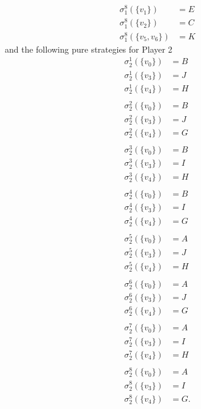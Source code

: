 \documentclass[a4paper]{article}
\begin{document}
\begin{exercise}{3}
\begin{enumerate}[label=(\alph*)]
\begin{enumerate}[label=(\roman*)]
\begin{align*}
            \sigma_1^{8}(\{v_1\}) &= E \\
            \sigma_1^{8}(\{v_2\}) &= C \\
            \sigma_1^{8}(\{v_5, v_6\}) &= K
          \end{align*}
          and the following pure strategies for Player 2
          \begin{align*}
            \sigma_2^{1}(\{v_0\}) &= B \\
            \sigma_2^{1}(\{v_3\}) &= J \\
            \sigma_2^{1}(\{v_4\}) &= H \\
            \\
            \sigma_2^{2}(\{v_0\}) &= B \\
            \sigma_2^{2}(\{v_3\}) &= J \\
            \sigma_2^{2}(\{v_4\}) &= G \\
            \\
            \sigma_2^{3}(\{v_0\}) &= B \\
            \sigma_2^{3}(\{v_3\}) &= I \\
            \sigma_2^{3}(\{v_4\}) &= H \\
            \\
            \sigma_2^{4}(\{v_0\}) &= B \\
            \sigma_2^{4}(\{v_3\}) &= I \\
            \sigma_2^{4}(\{v_4\}) &= G \\
            \\
            \sigma_2^{5}(\{v_0\}) &= A \\
            \sigma_2^{5}(\{v_3\}) &= J \\
            \sigma_2^{5}(\{v_4\}) &= H \\
            \\
            \sigma_2^{6}(\{v_0\}) &= A \\
            \sigma_2^{6}(\{v_3\}) &= J \\
            \sigma_2^{6}(\{v_4\}) &= G \\
            \\
            \sigma_2^{7}(\{v_0\}) &= A \\
            \sigma_2^{7}(\{v_3\}) &= I \\
            \sigma_2^{7}(\{v_4\}) &= H \\
            \\
            \sigma_2^{8}(\{v_0\}) &= A \\
            \sigma_2^{8}(\{v_3\}) &= I \\
            \sigma_2^{8}(\{v_4\}) &= G
          .\end{align*}
      \end{enumerate}


\end{enumerate}
\end{exercise}
\end{document}
